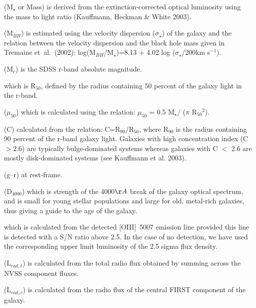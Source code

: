 \documentclass[usenatbib]{mn2e}
\begin{document}
\begin{description}[align=left]
\item  [stellar mass] (M$_{\star}$ or Mass) is derived from the extinction-corrected
 optical luminosity using the mass to light ratio (Kauffmann, Heckman \& White 2003).
\item [black hole mass] (M$_{BH}$) is estimated using the velocity
  dispersion (${\sigma}_{\star}$) of the galaxy and the relation between
  the velocity dispersion and the black hole mass given in Tremaine
  et~al.\ (2002): log(M$_{BH}$/M$_{\star}$)=8.13 + 4.02 log
  (${\sigma}_{\star}$/200km s$^{-1}$).
\item [absolute magnitude] (M$_{r}$) is the SDSS r-band absolute
  magnitude.
\item [size] which is R$_{50}$, defined by the radius containing 50 percent
  of the galaxy light in the r-band.
\item [half-light surface mass density] ($\mu_{50}$) which is calculated
  using the relation: $\mu_{50}$ = 0.5 M$_{\star}$/ ($\pi$
  R$_{50}$$^{2}$).
\item [concentration] (C) calculated from the relation:
  C=R$_{90}$/R$_{50}$, where R$_{90}$ is the radius containing 90 percent
  of the r-band galaxy light. Galaxies with high concentration index
  (C$>$2.6) are typically bulge-dominated systems whereas galaxies with C
  $<$ 2.6 are mostly disk-dominated systems (see Kauffmann et al. 2003).
\item [colour] (g--r) at rest-frame.
\item [4000$\AA$ break] (D$_{4000}$) which is strength of the 4000$\AA$
  break of the galaxy optical spectrum, and is small for young stellar
  populations and large for old, metal-rich galaxies, thus giving a guide
  to the age of the galaxy.
\item [OIII luminosity] which is calculated from the detected [OIII]~5007
  emission line provided this line is detected with a S/N ratio above
  2.5. In the case of no detection, we have used the corresponding upper
  limit luminosity of the 2.5 sigma flux density.
\item [total radio luminosity] (L$_{rad,t}$) is calculated from the total
  radio flux obtained by summing across the NVSS component fluxes.
\item [core radio luminosity] (L$_{rad,c}$) is calculated from the radio
  flux of the central FIRST component of the galaxy.
\end{description}
\end{document}
